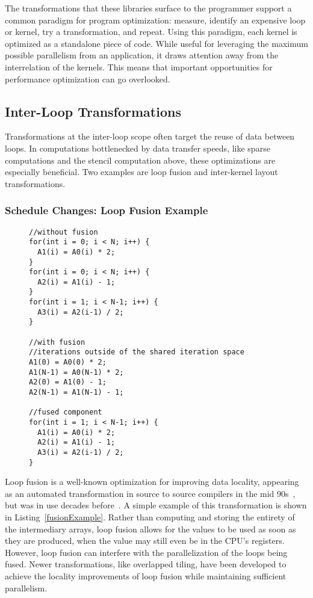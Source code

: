 The transformations that these libraries surface to the programmer support a common paradigm for program optimization: measure, identify an expensive loop or kernel, try a transformation, and repeat.
Using this paradigm, each kernel is optimized as a standalone piece of code.
While useful for leveraging the maximum possible parallelism from an application, it draws attention away from the interrelation of the kernels.
This means that important opportunities for performance optimization can go overlooked.


\subsection{Inter-Loop Transformations}
Transformations at the inter-loop scope often target the reuse of data between loops.
In computations bottlenecked by data transfer speeds, like sparse computations and the stencil computation above, these optimizations are especially beneficial. 
Two examples are loop fusion and inter-kernel layout transformations.

\subsubsection{Schedule Changes: Loop Fusion Example}
\begin{figure}
\begin{lstlisting}[caption={Three loops, with and without loop fusion.},label=fusionExample]
//without fusion
for(int i = 0; i < N; i++) {
  A1(i) = A0(i) * 2;
}
for(int i = 0; i < N; i++) {
  A2(i) = A1(i) - 1;
}
for(int i = 1; i < N-1; i++) {
  A3(i) = A2(i-1) / 2;
}

//with fusion
//iterations outside of the shared iteration space
A1(0) = A0(0) * 2;
A1(N-1) = A0(N-1) * 2;
A2(0) = A1(0) - 1;
A2(N-1) = A1(N-1) - 1;

//fused component
for(int i = 1; i < N-1; i++) {
  A1(i) = A0(i) * 2;
  A2(i) = A1(i) - 1;
  A3(i) = A2(i-1) / 2;
}
\end{lstlisting}
\end{figure}

Loop fusion is a well-known optimization for improving data locality, appearing as an automated transformation in source to source compilers in the mid 90s~\cite{mckinley1996improving}, but was in use decades before~\cite{warren1984hierarchical,cocke1971catalogue}.
A simple example of this transformation is shown in Listing~\ref{fusionExample}.
Rather than computing and storing the entirety of the intermediary arrays, loop fusion allows for the values to be used as soon as they are produced, when the value may still even be in the CPU's registers.
However, loop fusion can interfere with the parallelization of the loops being fused.
Newer transformations, like overlapped tiling, have been developed to achieve the locality improvements of loop fusion while maintaining sufficient parallelism.

